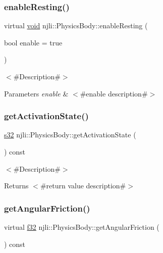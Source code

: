 \subsubsection{\texorpdfstring{enable\+Resting()}{enableResting()}}
{\footnotesize\ttfamily virtual \mbox{\hyperlink{_thread_8h_af1e856da2e658414cb2456cb6f7ebc66}{void}} njli\+::\+Physics\+Body\+::enable\+Resting (\begin{DoxyParamCaption}\item[{bool}]{enable = {\ttfamily true} }\end{DoxyParamCaption})\hspace{0.3cm}{\ttfamily [virtual]}}

$<$\#\+Description\#$>$


\begin{DoxyParams}{Parameters}
{\em enable} & $<$\#enable description\#$>$ \\
\hline
\end{DoxyParams}
\mbox{\label{classnjli_1_1_physics_body_a5c92da5dcc5580adad10fced20266d33}} 
\subsubsection{\texorpdfstring{get\+Activation\+State()}{getActivationState()}}
{\footnotesize\ttfamily \mbox{\hyperlink{_util_8h_aa62c75d314a0d1f37f79c4b73b2292e2}{s32}} njli\+::\+Physics\+Body\+::get\+Activation\+State (\begin{DoxyParamCaption}{ }\end{DoxyParamCaption}) const}

$<$\#\+Description\#$>$

\begin{DoxyReturn}{Returns}
$<$\#return value description\#$>$ 
\end{DoxyReturn}
\mbox{\label{classnjli_1_1_physics_body_aacb7f2a5e518977ee8db878286b86884}} 
\subsubsection{\texorpdfstring{get\+Angular\+Friction()}{getAngularFriction()}}
{\footnotesize\ttfamily virtual \mbox{\hyperlink{_util_8h_a5f6906312a689f27d70e9d086649d3fd}{f32}} njli\+::\+Physics\+Body\+::get\+Angular\+Friction (\begin{DoxyParamCaption}{ }\end{DoxyParamCaption}) const\hspace{0.3cm}{\ttfamily [virtual]}}

